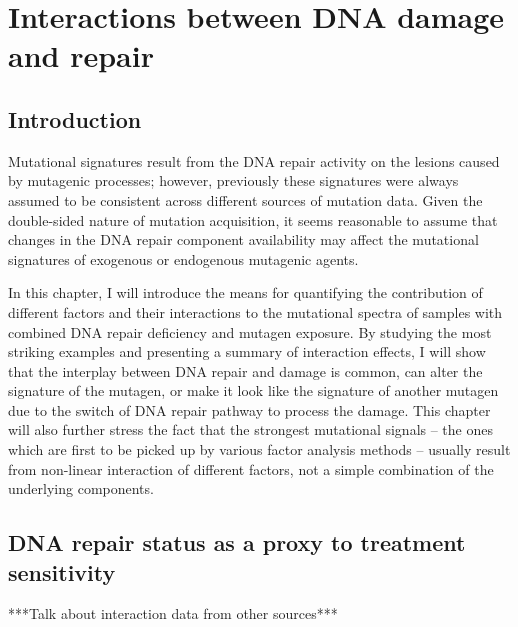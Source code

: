 


\pagestyle{empty}

\chapter{Interactions between DNA damage and repair}

\section{Introduction}

Mutational signatures result from the DNA repair activity on the lesions caused by mutagenic
processes; however, previously these signatures were always assumed to be consistent across different 
sources of mutation data. Given the double-sided nature of mutation acquisition, it seems 
reasonable to assume that changes in the DNA repair component availability
may affect the mutational signatures of exogenous or endogenous mutagenic agents.

In this chapter, I will introduce the means for quantifying the contribution of different factors and their
interactions to the mutational spectra of samples with combined DNA repair deficiency and mutagen
exposure. By studying the most striking examples and presenting a summary of interaction effects,
I will show that the interplay between DNA repair and damage is common, can alter the signature
of the mutagen, or make it look like the signature of another mutagen due to the switch of DNA repair
pathway to process the damage. This chapter will also further stress the fact that the strongest
mutational signals -- the ones which are first to be picked up by various factor analysis methods
-- usually result from non-linear interaction of different factors, not a simple combination of
the underlying components.


\section{DNA repair status as a proxy to treatment sensitivity}

***Talk about interaction data from other sources***

